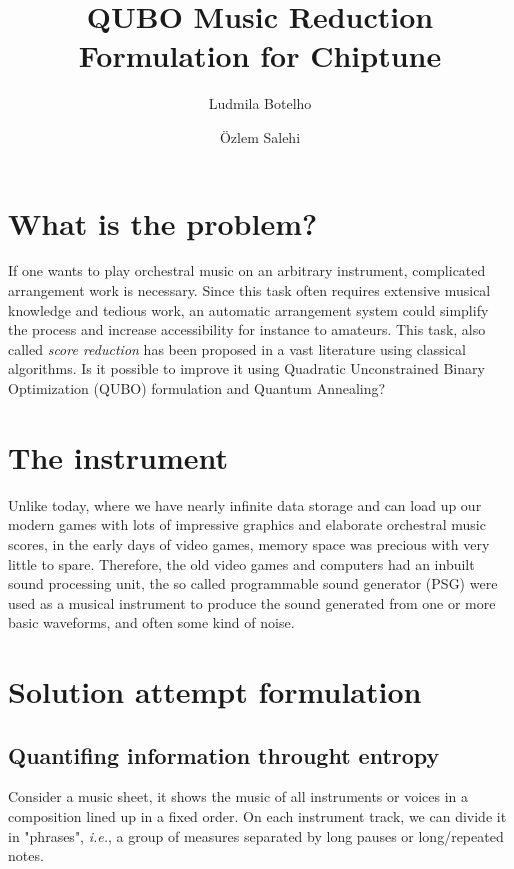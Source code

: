 \documentclass[a4paper,onecolumn,11pt,unpublished,allowfontchangeintitle]{quantumarticle}
\theoremstyle{definition}
\begin{document}
\title{QUBO Music Reduction Formulation for Chiptune}

\author{Ludmila Botelho}
\author{Özlem Salehi}


\maketitle

\section{What is the problem?}

If one wants to play orchestral music on an arbitrary instrument, complicated arrangement work is necessary. Since this task often requires extensive musical knowledge and tedious work, an automatic arrangement system could simplify the process and increase accessibility for instance to amateurs. This task, also called \emph{score reduction} has been proposed in a vast literature using classical algorithms. Is it possible to improve it using Quadratic Unconstrained Binary Optimization (QUBO) formulation and Quantum Annealing?

\section{The instrument}
Unlike today, where we have nearly infinite data storage and can load up our modern games with lots of impressive graphics and elaborate orchestral music scores, in the early days of video games, memory space was precious with very little to spare. Therefore, the old video games and computers had an inbuilt sound processing unit, the so called programmable sound generator (PSG) were used as a musical instrument to produce the sound generated from one or more basic waveforms, and often some kind of noise. 

\section{Solution attempt formulation}
\subsection{Quantifing information throught entropy}
Consider a music sheet, it shows the music of all instruments or voices in a composition lined up in a fixed order. On each instrument track, we can divide it in "phrases", \emph{i.e.}, a group of measures separated by long pauses or long/repeated notes. 
\end{document}
